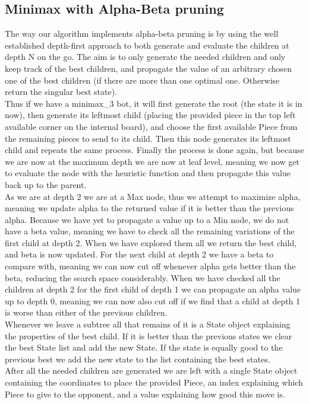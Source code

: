 \documentclass[12pt, a4paper]{article}
\begin{document}
\subsection{Minimax with Alpha-Beta pruning}
The way our algorithm implements alpha-beta pruning is by using the well established depth-first approach to both generate and evaluate the children at depth N on the go. The aim is to only generate the needed children and only keep track of the best children, and propagate the value of an arbitrary chosen one of the best children (if there are more than one optimal one. Otherwise return the singular best state). \\ 
Thus if we have a minimax\_3 bot, it will first generate the root (the state it is in now), then generate its leftmost child (placing the provided piece in the top left available corner on the internal board), and choose the first available Piece from the remaining pieces to send to its child. Then this node generates its leftmost child and repeats the same process. Finally the process is done again, but because we are now at the maximum depth we are now at leaf level, meaning we now get to evaluate the node with the heuristic function and then propagate this value back up to the parent. \\
As we are at depth 2 we are at a Max node, thus we attempt to maximize alpha, meaning we update alpha to the returned value if it is better than the previous alpha. Because we have yet to propagate a value up to a Min node, we do not have a beta value, meaning we have to check all the remaining variations of the first child at depth 2. When we have explored them all we return the best child, and beta is now updated. For the next child at depth 2 we have a beta to compare with, meaning we can now cut off whenever alpha gets better than the beta, reducing the search space considerably. When we have checked all the children at depth 2 for the first child of depth 1 we can propagate an alpha value up to depth 0, meaning we can now also cut off if we find that a child at depth 1 is worse than either of the previous children.\\
Whenever we leave a subtree all that remains of it is a State object explaining the properties of the best child. If it is better than the previous states we clear the best State list and add the new State. If the state is equally good to the previous best we add the new state to the list containing the best states. \\
After all the needed children are generated we are left with a single State object containing the coordinates to place the provided Piece, an index explaining which Piece to give to the opponent, and a value explaining how good this move is. 
\end{document}
